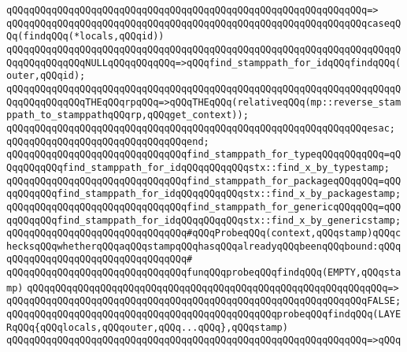 \verb|qQQqqQQqqQQqqQQqqQQqqQQqqQQqqQQqqQQqqQQqqQQqqQQqqQQqqQQqqQQqqQQq=>|\newline
\verb|qQQqqQQqqQQqqQQqqQQqqQQqqQQqqQQqqQQqqQQqqQQqqQQqqQQqqQQqqQQqqQQqcaseqQQq(findqQQq(*locals,qQQqid))|\newline
\verb|qQQqqQQqqQQqqQQqqQQqqQQqqQQqqQQqqQQqqQQqqQQqqQQqqQQqqQQqqQQqqQQqqQQqqQQqqQQqqQQqqQQqNULLqQQqqQQqqQQq=>qQQqfind_stamppath_for_idqQQqfindqQQq(outer,qQQqid);|\newline
\verb|qQQqqQQqqQQqqQQqqQQqqQQqqQQqqQQqqQQqqQQqqQQqqQQqqQQqqQQqqQQqqQQqqQQqqQQqqQQqqQQqqQQqTHEqQQqrpqQQq=>qQQqTHEqQQq(relativeqQQq(mp::reverse_stamppath_to_stamppathqQQqrp,qQQqget_context));|\newline
\verb|qQQqqQQqqQQqqQQqqQQqqQQqqQQqqQQqqQQqqQQqqQQqqQQqqQQqqQQqqQQqqQQqesac;|\newline
\verb|qQQqqQQqqQQqqQQqqQQqqQQqqQQqqQQqend;|\newline
\newline
\verb|qQQqqQQqqQQqqQQqqQQqqQQqqQQqqQQqfind_stamppath_for_typeqQQqqQQqqQQq=qQQqqQQqqQQqfind_stamppath_for_idqQQqqQQqqQQqstx::find_x_by_typestamp;|\newline
\verb|qQQqqQQqqQQqqQQqqQQqqQQqqQQqqQQqfind_stamppath_for_packageqQQqqQQq=qQQqqQQqqQQqfind_stamppath_for_idqQQqqQQqqQQqstx::find_x_by_packagestamp;|\newline
\verb|qQQqqQQqqQQqqQQqqQQqqQQqqQQqqQQqfind_stamppath_for_genericqQQqqQQq=qQQqqQQqqQQqfind_stamppath_for_idqQQqqQQqqQQqstx::find_x_by_genericstamp;|\newline
\newline
\verb|qQQqqQQqqQQqqQQqqQQqqQQqqQQqqQQq#qQQqProbeqQQq(context,qQQqstamp)qQQqchecksqQQqwhetherqQQqaqQQqstampqQQqhasqQQqalreadyqQQqbeenqQQqbound:qQQq|\newline
\verb|qQQqqQQqqQQqqQQqqQQqqQQqqQQqqQQq#|\newline
\verb|qQQqqQQqqQQqqQQqqQQqqQQqqQQqqQQqfunqQQqprobeqQQqfindqQQq(EMPTY,qQQqstamp)|\newline
\verb|qQQqqQQqqQQqqQQqqQQqqQQqqQQqqQQqqQQqqQQqqQQqqQQqqQQqqQQqqQQqqQQq=>|\newline
\verb|qQQqqQQqqQQqqQQqqQQqqQQqqQQqqQQqqQQqqQQqqQQqqQQqqQQqqQQqqQQqqQQqFALSE;|\newline
\newline
\verb|qQQqqQQqqQQqqQQqqQQqqQQqqQQqqQQqqQQqqQQqqQQqqQQqprobeqQQqfindqQQq(LAYERqQQq{qQQqlocals,qQQqouter,qQQq...qQQq},qQQqstamp)|\newline
\verb|qQQqqQQqqQQqqQQqqQQqqQQqqQQqqQQqqQQqqQQqqQQqqQQqqQQqqQQqqQQqqQQq=>qQQq|\newline
